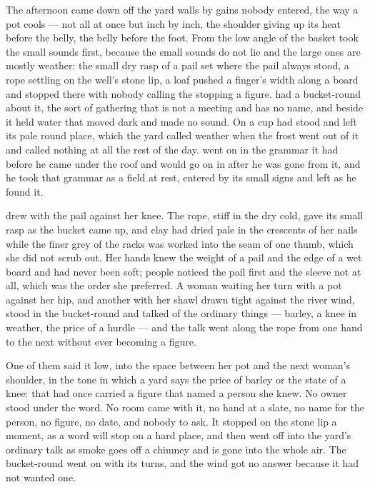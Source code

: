 The afternoon came down off the yard walls by gains nobody entered, the way a pot cools --- not all at once but inch by inch, the shoulder giving up its heat before the belly, the belly before the foot. From the low angle of the basket  took the small sounds first, because the small sounds do not lie and the large ones are mostly weather: the small dry rasp of a pail set where the pail always stood, a rope settling on the well's stone lip, a loaf pushed a finger's width along a board and stopped there with nobody calling the stopping a figure.  had a bucket-round about it, the sort of gathering that is not a meeting and has no name, and  beside it held water that moved dark and made no sound. On  a cup had stood and left its pale round place, which the yard called weather when the frost went out of it and called nothing at all the rest of the day.  went on in the grammar it had before he came under the roof and would go on in after he was gone from it, and he took that grammar as a field at rest, entered by its small signs and left as he found it.

 drew with the pail against her knee. The rope, stiff in the dry cold, gave its small rasp as the bucket came up, and clay had dried pale in the crescents of her nails while the finer grey of the racks was worked into the seam of one thumb, which she did not scrub out. Her hands knew the weight of a pail and the edge of a wet board and had never been soft; people noticed the pail first and the sleeve not at all, which was the order she preferred. A woman waiting her turn with a pot against her hip, and another with her shawl drawn tight against the river wind, stood in the bucket-round and talked of the ordinary things --- barley, a knee in weather, the price of a hurdle --- and the talk went along the rope from one hand to the next without ever becoming a figure.

One of them said it low, into the space between her pot and the next woman's shoulder, in the tone in which a yard says the price of barley or the state of a knee: that  had once carried a figure that named a person she knew. No owner stood under the word. No room came with it, no hand at a slate, no name for the person, no figure, no date, and nobody to ask. It stopped on the stone lip a moment, as a word will stop on a hard place, and then went off into the yard's ordinary talk as smoke goes off a chimney and is gone into the whole air. The bucket-round went on with its turns, and the wind got no answer because it had not wanted one.

